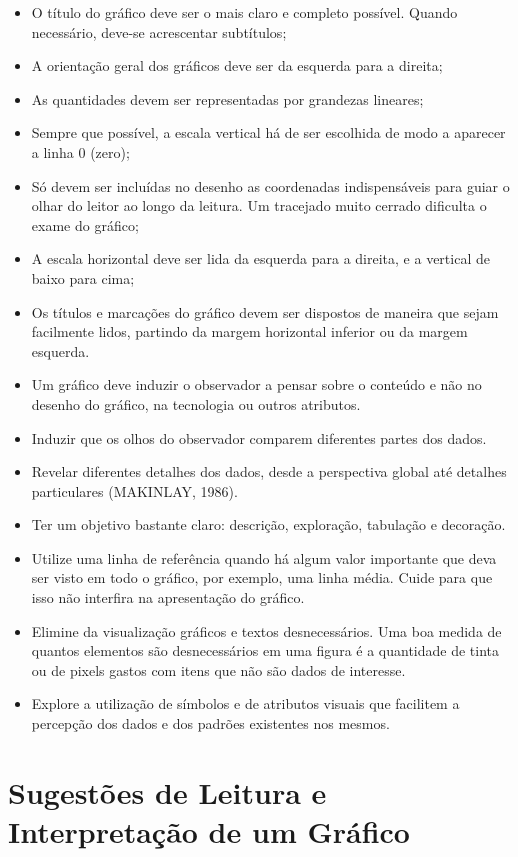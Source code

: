 \begin{itemize}
\item O título do gráfico deve ser o mais claro e completo possível. Quando necessário, deve-se acrescentar subtítulos;
\item A orientação geral dos gráficos deve ser da esquerda para a direita;
\item As quantidades devem ser representadas por grandezas lineares;
\item Sempre que possível, a escala vertical há de ser escolhida de modo a aparecer a linha 0 (zero);
\item Só devem ser incluídas no desenho as coordenadas indispensáveis para guiar o olhar do leitor ao longo da leitura. Um tracejado muito cerrado dificulta o exame do gráfico;
\item A escala horizontal deve ser lida da esquerda para a direita, e a vertical de baixo para cima;
\item Os títulos e marcações do gráfico devem ser dispostos de maneira que sejam facilmente lidos, partindo da margem horizontal inferior ou da margem esquerda.
\item Um gráfico deve induzir o observador a pensar sobre o conteúdo e não no desenho do gráfico, na tecnologia ou outros atributos.
\item Induzir que os olhos do observador comparem diferentes partes dos dados.
\item Revelar diferentes detalhes dos dados, desde a perspectiva global até detalhes particulares (MAKINLAY, 1986).
\item Ter um objetivo bastante claro: descrição, exploração, tabulação e decoração.
\item Utilize uma linha de referência quando há algum valor importante que deva ser visto em todo o gráfico, por exemplo, uma linha média. Cuide para que isso não interfira na apresentação do gráfico.
\item Elimine da visualização gráficos e textos desnecessários. Uma boa medida de
quantos elementos são desnecessários em uma figura é a quantidade de tinta ou de
pixels gastos com itens que não são dados de interesse.
\item Explore a utilização de símbolos e de atributos visuais que facilitem a percepção
dos dados e dos padrões existentes nos mesmos.
\end{itemize}


\section{Sugestões de Leitura e Interpretação de um Gráfico}

